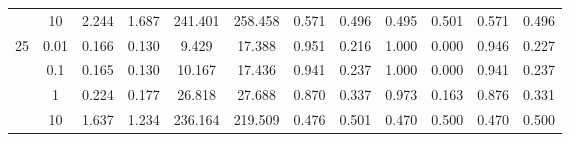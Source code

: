 \documentclass[11pt]{article}
\theoremstyle{definition}
\begin{document}
\begin{sidewaysfigure}
\begin{tabular}{cccccc|cccccc}
 & 10 & 2.244 & 1.687 & 241.401 & 258.458 & 0.571 & 0.496 & 0.495 & 0.501 & 0.571 & 0.496\\[.3cm]  
\multirow{4}{*}{25}   & 0.01   & 0.166 & 0.130 & 9.429 & 17.388 & 0.951 & 0.216 & 1.000 & 0.000 & 0.946 & 0.227 \\ 
 &0.1  & 0.165 & 0.130 & 10.167 & 17.436 & 0.941 & 0.237 & 1.000 & 0.000 & 0.941 & 0.237 \\ 
 & 1 & 0.224 & 0.177 & 26.818 & 27.688 & 0.870 & 0.337 & 0.973 & 0.163 & 0.876 & 0.331 \\ 
  &  10 & 1.637 & 1.234 & 236.164 & 219.509 & 0.476 & 0.501 & 0.470 & 0.500 & 0.470 & 0.500 \\ 
\end{tabular}
\end{sidewaysfigure}
\end{document}

